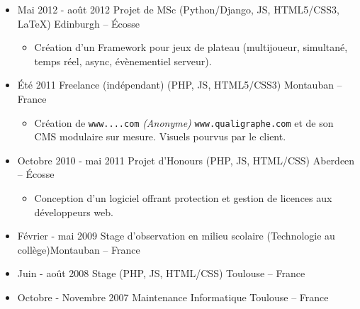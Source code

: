 \documentclass{res}
\begin{document}
\begin{resume}
\begin{itemize}
\begin{itemize}
\begin{itemize}
				\item[+] divers scripts pour prototyper, acc\'el\'erer ou automatiser des t\^aches : stockage~/ r\'ecup\'eration~/ backup\textellipsis
				\item[+] l'export de donn\'ees depuis nos caches vers deux it\'erations successives de XMLs, en g\'en\'erant des XSLTs et des XSDs \`a partir de meta-XSLTs. Cela nous a permis de publier du XML avec diff\'erentes versions de schemas.
				\item[+] la conception et l'impl\'ementation d'un algorithme de Hepburn modifi\'e pour la translitt\'eration du japonais.
				\item[+] la d\'ecommission de commandes de terminaux depuis TPF (IBM) vers une nouvelle architecture en C++.
				\item[+] maintenance, support et point de contact de nos applications.
			\end{itemize}
		\end{itemize}
		\item[] Mai 2012 - ao\^ut 2012 \tabto{5cm} Projet de MSc (Python/Django, JS, HTML5/CSS3, \LaTeX{}) \hfill Edinburgh -- \'Ecosse
		\begin{itemize}
			\item[] Cr\'eation d'un Framework pour jeux de plateau (multijoueur, simultan\'e, temps r\'eel, async, \'ev\`enementiel serveur).
		\end{itemize}
		\item[] \'Et\'e 2011 \tabto{5cm} Freelance (ind\'ependant) (PHP, JS, HTML5/CSS3) \hfill Montauban -- France
		\begin{itemize}
			\item[] Cr\'eation de \ifisanon \texttt{www....com} \textit{(Anonyme)} \else \texttt{www.qualigraphe.com} \fi et de son CMS modulaire sur mesure. Visuels pourvus par le client.
		\end{itemize}
		\item[] Octobre 2010 - mai 2011 \tabto{5cm} Projet d'Honours (PHP, JS, HTML/CSS) \hfill Aberdeen -- \'Ecosse
		\begin{itemize}
			\item[] Conception d'un logiciel offrant protection et gestion de licences aux d\'eveloppeurs web.
		\end{itemize}
		\item[] F\'evrier - mai 2009 \tabto{5cm} Stage d'observation en milieu scolaire (Technologie au coll\`ege)\hfill Montauban -- France
		\item[] Juin - ao\^ut 2008 \tabto{5cm} Stage (PHP, JS, HTML/CSS) \hfill Toulouse -- France
		\item[] Octobre - Novembre 2007 \tabto{5cm} Maintenance Informatique \hfill Toulouse -- France
	\end{itemize}
		

\end{resume}
\end{document}
